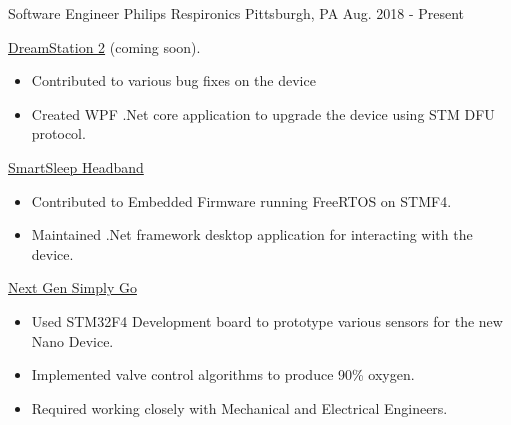 


\begin{cventries}


\cventry
{Software Engineer} %
{Philips Respironics} %
{Pittsburgh, PA} %
{Aug. 2018 - Present} %
{ %
\begin{cvitems}
\item 
{
    \href{https://www.usa.philips.com/healthcare/product/HCNOCTN447/dreamstation-cpap-bi-level-therapy-systems}{\color{RoyalBlue}DreamStation 2} 
    (coming soon).
    \begin{itemize}
        \item Contributed to various bug fixes on the device
        \item Created WPF .Net core application to upgrade the device using STM DFU protocol. 
    \end{itemize} 
}
\item 
{
    \href{https://www.usa.philips.com/c-e/smartsleep/deep-sleep-headband.html}{\color{RoyalBlue}SmartSleep Headband} 
    \begin{itemize}
        \item Contributed to Embedded Firmware running FreeRTOS on STMF4. 
        \item Maintained .Net framework desktop application for interacting with the device.
    \end{itemize} 
}
\item 
{
    \href{https://www.usa.philips.com/healthcare/product/HCNOCTN350/simplygo-mini-portable-oxygen-concentrator-poc}{\color{RoyalBlue}Next Gen Simply Go} 
    \begin{itemize}
        \item Used STM32F4 Development board to prototype various sensors for the new Nano Device.
        \item Implemented valve control algorithms to produce 90\% oxygen.
        \item Required working closely with Mechanical and Electrical Engineers. 

\end{itemize}}
\end{cvitems}}
\end{cventries}
